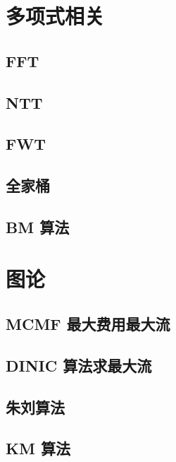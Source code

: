 \documentclass[a4paper,12pt]{article}
\begin{document}
\section{多项式相关}

\subsection{FFT}

\subsection{NTT}

\subsection{FWT}

\subsection{全家桶}

\subsection{BM 算法}


\section{图论}

\subsection{MCMF 最大费用最大流}

\subsection{DINIC 算法求最大流}

\subsection{朱刘算法}

\subsection{KM 算法}

\end{document}
